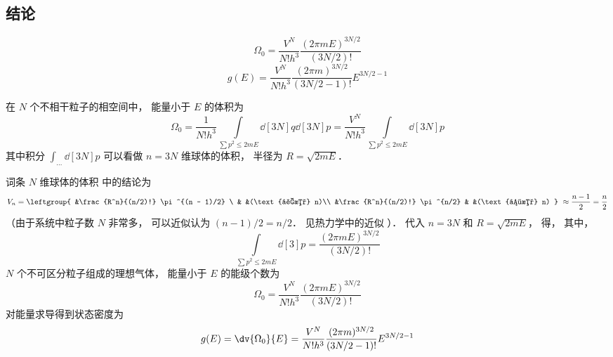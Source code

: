 

\subsection{结论}
\begin{equation}
\Omega_0 = \frac{V^N}{N! h^3} \frac{(2\pi mE)^{3N/2}}{(3N/2)!}
\end{equation}
\begin{equation}
g(E) = \frac{V^N}{N! h^3} \frac{(2\pi m)^{3N/2}}{(3N/2-1)!} E^{3N/2 - 1}
\end{equation}

在 $N$ 个不相干粒子的相空间中， 能量小于 $E$ 的体积为
\begin{equation}
\Omega_0 = \frac{1}{N! h^3} \int\limits_{\sum p^2 \leqslant 2mE} \dd[3N]{q} \dd[3N]{p} = \frac{V^N}{N! h^3} \int\limits_{\sum p^2 \leqslant 2mE} \dd[3N]{p}
\end{equation}
其中积分 $\int_{\dots} \dd[3N]{p} $ 可以看做 $n=3N$ 维球体的体积， 半径为 $R = \sqrt{2mE}$． 

词条 $N$ 维球体的体积
中的结论为 
\begin{equation}
V_n = \leftgroup{
&\frac{R^n}{(n/2)!} \pi^{(n - 1)/2} \ & &(\text{奇数} n)\\
&\frac{R^n}{(n/2)!} \pi^{n/2}  & &(\text{偶数} n)
} \ \approx \frac{n - 1}{2} = \frac{n}{2}
\end{equation}
（由于系统中粒子数 $N$ 非常多， 可以近似认为 $(n - 1)/2 = n/2$．  见热力学中的近似%
）． 代入 $n=3N$ 和 $R = \sqrt{2mE} $，   得， %
其中，
\begin{equation}
\int\limits_{\sum p^2 \leqslant 2mE} \dd[3]{p} = \frac{(2\pi mE)^{3N/2}}{(3N/2)!}
\end{equation}
$N$ 个不可区分粒子组成的理想气体， 能量小于 $E$ 的能级个数为
\begin{equation}
\Omega_0 = \frac{V^N}{N! h^3} \frac{(2\pi mE)^{3N/2}}{(3N/2)!}
\end{equation}
对能量求导得到状态密度为
\begin{equation}
g(E) = \dv{\Omega_0}{E} = \frac{V^N}{N! h^3} \frac{(2\pi m)^{3N/2}}{(3N/2 - 1)!} E^{3N/2 - 1}
\end{equation}

